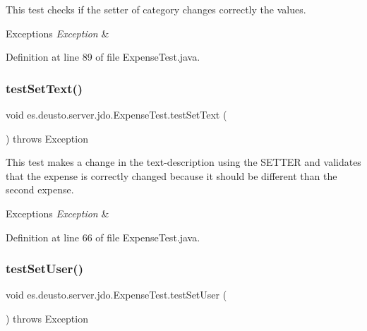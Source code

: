 This test checks if the setter of category changes correctly the values. 
\begin{DoxyExceptions}{Exceptions}
{\em Exception} & \\
\hline
\end{DoxyExceptions}


Definition at line 89 of file Expense\+Test.\+java.

\mbox{\label{classes_1_1deusto_1_1server_1_1jdo_1_1_expense_test_a766834aa2f51b6aacc54dd13b43b2f6f}} 
\subsubsection{\texorpdfstring{test\+Set\+Text()}{testSetText()}}
{\footnotesize\ttfamily void es.\+deusto.\+server.\+jdo.\+Expense\+Test.\+test\+Set\+Text (\begin{DoxyParamCaption}{ }\end{DoxyParamCaption}) throws Exception}

This test makes a change in the text-\/description using the S\+E\+T\+T\+ER and validates that the expense is correctly changed because it should be different than the second expense. 
\begin{DoxyExceptions}{Exceptions}
{\em Exception} & \\
\hline
\end{DoxyExceptions}


Definition at line 66 of file Expense\+Test.\+java.

\mbox{\label{classes_1_1deusto_1_1server_1_1jdo_1_1_expense_test_a54d2e8a158f8a3d22df5a68074ce4c1e}} 
\subsubsection{\texorpdfstring{test\+Set\+User()}{testSetUser()}}
{\footnotesize\ttfamily void es.\+deusto.\+server.\+jdo.\+Expense\+Test.\+test\+Set\+User (\begin{DoxyParamCaption}{ }\end{DoxyParamCaption}) throws Exception}

